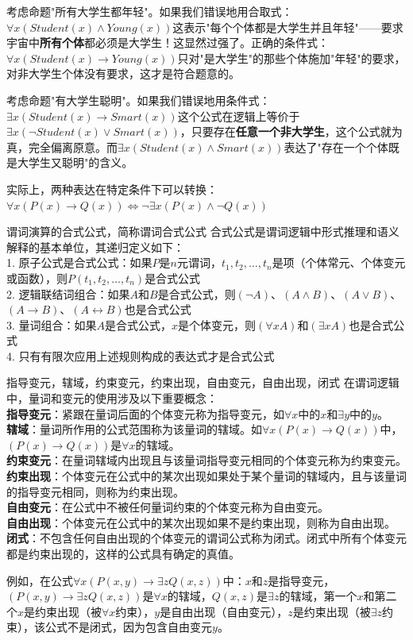 考虑命题"所有大学生都年轻"。如果我们错误地用合取式：$\forall x (Student(x) \land Young(x))$这表示"每个个体都是大学生并且年轻"——要求宇宙中\textbf{所有个体}都必须是大学生！这显然过强了。正确的条件式：$\forall x (Student(x) \rightarrow Young(x))$只对"是大学生"的那些个体施加"年轻"的要求，对非大学生个体没有要求，这才是符合题意的。

考虑命题"有大学生聪明"。如果我们错误地用条件式：$\exists x (Student(x) \rightarrow Smart(x))$这个公式在逻辑上等价于$\exists x (\neg Student(x) \lor Smart(x))$，只要存在\textbf{任意一个非大学生}，这个公式就为真，完全偏离原意。而$\exists x (Student(x) \land Smart(x))$表达了"存在一个个体既是大学生又聪明"的含义。

实际上，两种表达在特定条件下可以转换：$\forall x (P(x) \rightarrow Q(x)) \Leftrightarrow \neg \exists x (P(x) \land \neg Q(x))$
\begin{definition}{谓词演算的合式公式，简称谓词合式公式}{}
合式公式是谓词逻辑中形式推理和语义解释的基本单位，其递归定义如下：\\
1. 原子公式是合式公式：如果$P$是$n$元谓词，$t_1, t_2, \ldots, t_n$是项（个体常元、个体变元或函数），则$P(t_1, t_2, \ldots, t_n)$是合式公式\\
2. 逻辑联结词组合：如果$A$和$B$是合式公式，则$(\neg A)$、$(A \land B)$、$(A \lor B)$、$(A \rightarrow B)$、$(A \leftrightarrow B)$也是合式公式\\
3. 量词组合：如果$A$是合式公式，$x$是个体变元，则$(\forall x A)$和$(\exists x A)$也是合式公式\\
4. 只有有限次应用上述规则构成的表达式才是合式公式
\end{definition}
\begin{definition}{指导变元，辖域，约束变元，约束出现，自由变元，自由出现，闭式}{}
在谓词逻辑中，量词和变元的使用涉及以下重要概念：\\
\textbf{指导变元}：紧跟在量词后面的个体变元称为指导变元，如$\forall x$中的$x$和$\exists y$中的$y$。\\
\textbf{辖域}：量词所作用的公式范围称为该量词的辖域。如$\forall x (P(x) \rightarrow Q(x))$中，$(P(x) \rightarrow Q(x))$是$\forall x$的辖域。\\
\textbf{约束变元}：在量词辖域内出现且与该量词指导变元相同的个体变元称为约束变元。\\
\textbf{约束出现}：个体变元在公式中的某次出现如果处于某个量词的辖域内，且与该量词的指导变元相同，则称为约束出现。\\
\textbf{自由变元}：在公式中不被任何量词约束的个体变元称为自由变元。\\
\textbf{自由出现}：个体变元在公式中的某次出现如果不是约束出现，则称为自由出现。\\
\textbf{闭式}：不包含任何自由出现的个体变元的谓词公式称为闭式。闭式中所有个体变元都是约束出现的，这样的公式具有确定的真值。
\end{definition}
例如，在公式$\forall x (P(x,y) \rightarrow \exists z Q(x,z))$中：$x$和$z$是指导变元，$(P(x,y) \rightarrow \exists z Q(x,z))$是$\forall x$的辖域，$Q(x,z)$是$\exists z$的辖域，第一个$x$和第二个$x$是约束出现（被$\forall x$约束），$y$是自由出现（自由变元），$z$是约束出现（被$\exists z$约束），该公式不是闭式，因为包含自由变元$y$。

